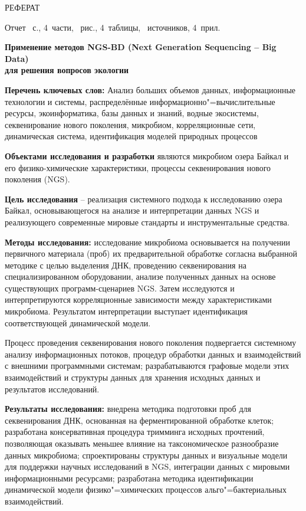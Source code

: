 \documentclass[a4paper,12pt,openany,final]{extreport}
\begin{document}
\begin{titlepage}
  \thispagestyle{empty}
  \begin{center}
    {\capfont РЕФЕРАТ}
  \end{center}

Отчет \pageref{LastPage}~с., 4~части, ~рис., 4~таблицы, ~источников, 4~прил.
\begin{center}
\textbf{Применение методов NGS-BD (Next Generation Sequencing -- Big Data)\\ для решения вопросов экологии}
\end{center}

\newcommand\RAZ[1]{{\bfseries #1}}

\RAZ{Перечень ключевых слов:} Анализ больших объемов данных, информационные технологии и системы, распределённые информационно"=вычислительные ресурсы, экоинформатика, базы данных и знаний, водные экосистемы, секвенирование нового поколения, микробиом, корреляционные сети, динамическая система, идентификация моделей природных процессов

\RAZ{Объектами исследования и разработки} являются микробиом озера Байкал и его физико-химические характеристики, процессы секвенирования нового поколения (NGS).

\RAZ{Цель исследования} -- реализация системного подхода к исследованию озера Байкал, основывающегося на анализе и интерпретации данных NGS и реализующего современные мировые стандарты и инструментальные средства.

\RAZ{Методы исследования:} исследование микробиома основывается на получении первичного материала (проб) их предварительной обработке согласна выбранной методике с целью выделения ДНК, проведению секвенирования на специализированном оборудовании, анализе полученных данных на основе существующих программ-сценариев NGS. Затем исследуются и интерпретируются корреляционные зависимости между характеристиками микробиома. Результатом интерпретации выступает идентификация соответствующей динамической модели.

\noindent{}Процесс проведения секвенирования нового поколения подвергается системному анализу информационных потоков, процедур обработки данных и взаимодействий с внешними программными системам; разрабатываются графовые модели этих взаимодействий и структуры данных для хранения исходных данных и результатов исследований.

\RAZ{Результаты исследования:} внедрена методика подготовки проб для секвенирования ДНК, основанная на ферментированной обработке клеток; разработана консервативная процедура тримминга исходных прочтений, позволяющая оказывать меньшее влияние на таксономическое разнообразие данных микробиома; спроектированы структуры данных и визуальные модели для поддержки научных исследований в NGS, интеграции данных с мировыми информационными ресурсами; разработана методика идентификации динамической модели физико"=химических процессов альго"=бактериальных взаимодействий.


\end{titlepage}
\end{document}
